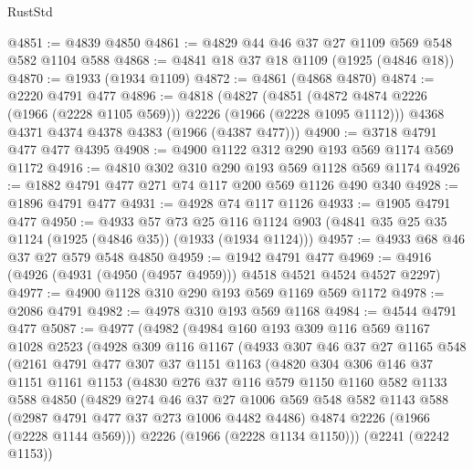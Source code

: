 \begin{lexlean}{RustStd}
\begin{coremodule}
@4851 := @4839 @4850
@4861 := @4829 @44 @46 @37 @27 @1109 @569 @548 @582 @1104 @588
@4868 := @4841 @18 @37 @18 @1109 (@1925 (@4846 @18))
@4870 := @1933 (@1934 @1109)
@4872 := @4861 (@4868 @4870)
@4874 := @2220 @4791 @477
@4896 := @4818
    (@4827
      (@4851 (@4872 @4874 @2226 (@1966 (@2228 @1105 @569))) @2226 (@1966 (@2228 @1095 @1112)))
      @4368
      @4371
      @4374
      @4378
      @4383
      (@1966 (@4387 @477)))
@4900 := @3718 @4791 @477 @477 @4395
@4908 := @4900 @1122 @312 @290 @193 @569 @1174 @569 @1172
@4916 := @4810 @302 @310 @290 @193 @569 @1128 @569 @1174
@4926 := @1882 @4791 @477 @271 @74 @117 @200 @569 @1126 @490 @340
@4928 := @1896 @4791 @477
@4931 := @4928 @74 @117 @1126
@4933 := @1905 @4791 @477
@4950 := @4933
    @57
    @73
    @25
    @116
    @1124
    @903
    (@4841 @35 @25 @35 @1124 (@1925 (@4846 @35)) (@1933 (@1934 @1124)))
@4957 := @4933 @68 @46 @37 @27 @579 @548 @4850
@4959 := @1942 @4791 @477
@4969 := @4916 (@4926 (@4931 (@4950 (@4957 @4959))) @4518 @4521 @4524 @4527 @2297)
@4977 := @4900 @1128 @310 @290 @193 @569 @1169 @569 @1172
@4978 := @2086 @4791
@4982 := @4978 @310 @193 @569 @1168
@4984 := @4544 @4791 @477
@5087 := @4977
    (@4982
      (@4984
        @160
        @193
        @309
        @116
        @569
        @1167
        @1028
        @2523
        (@4928
          @309
          @116
          @1167
          (@4933
            @307
            @46
            @37
            @27
            @1165
            @548
            (@2161
              @4791
              @477
              @307
              @37
              @1151
              @1163
              (@4820
                @304
                @306
                @146
                @37
                @1151
                @1161
                @1153
                (@4830
                  @276
                  @37
                  @116
                  @579
                  @1150
                  @1160
                  @582
                  @1133
                  @588
                  @4850
                  (@4829
                    @274
                    @46
                    @37
                    @27
                    @1006
                    @569
                    @548
                    @582
                    @1143
                    @588
                    (@2987 @4791 @477 @37 @273 @1006 @4482 @4486)
                    @4874
                    @2226
                    (@1966 (@2228 @1144 @569)))
                  @2226
                  (@1966 (@2228 @1134 @1150)))
                (@2241 (@2242 @1153))

\end{coremodule}
\end{lexlean}
